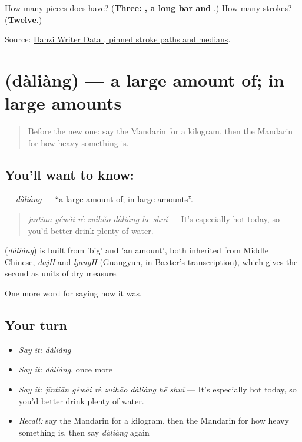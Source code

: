 \begin{tcolorbox}[breakable,colback=teal!4,colframe=teal!35!black,title={Before you move on}]
How many pieces does  have? (\textbf{Three: , a long bar and }.) How many strokes? (\textbf{Twelve}.)

Source: \href{https://raw.githubusercontent.com/chanind/hanzi-writer-data/68d10a4b21150cae5e1ebbd223eed289cf32d90c/data/\%E9\%87\%8F.json}{Hanzi Writer Data , pinned stroke paths and medians}.
\end{tcolorbox}
\section[\texorpdfstring{\zh{大量} (dàliàng)}{大量 (dàliàng)}]{ (dàliàng) — a large amount of; in large amounts}

\label{lesson:ZH-C526-daliang}



\begin{quote}
Before the new one: say the Mandarin for a kilogram, then the Mandarin for how heavy something is.
\end{quote}

\subsection*{You'll want to know: }
\textbf{} — \emph{dàliàng} — \textquotedblleft{}a large amount of; in large amounts\textquotedblright{}.

\begin{quote}
\textbf{} \emph{jīntiān géwài rè zuìhǎo dàliàng hē shuǐ} — It's especially hot today, so you'd better drink plenty of water.
\end{quote}

\begin{cousinweb}
\textbf{} (\emph{dàliàng}) is built from  'big' and  'an amount', both inherited from Middle Chinese, \emph{dajH} and \emph{ljangH} (Guangyun, in Baxter's transcription), which gives the second as units of dry measure.
\end{cousinweb}

\begin{grammarlens}[title={What you've built}]
One more word for saying how it was.
\end{grammarlens}

\subsection*{Your turn}
\begin{itemize}
\raggedright
  \item \emph{Say it:} \emph{dàliàng}
  \item \emph{Say it:} \emph{dàliàng}, once more
  \item \emph{Say it:} \emph{jīntiān géwài rè zuìhǎo dàliàng hē shuǐ} — It's especially hot today, so you'd better drink plenty of water.
  \item \emph{Recall:} say the Mandarin for a kilogram, then the Mandarin for how heavy something is, then say \emph{dàliàng} again
\end{itemize}

